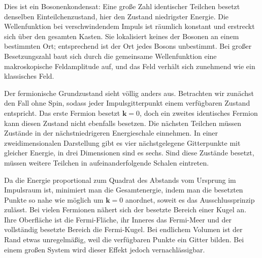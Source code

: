 Dies ist ein Bosonenkondensat: Eine große Zahl identischer Teilchen besetzt denselben Einteilchenzustand, hier den Zustand niedrigster Energie. Die Wellenfunktion bei verschwindendem Impuls ist räumlich konstant und erstreckt sich über den gesamten Kasten. Sie lokalisiert keines der Bosonen an einem bestimmten Ort; entsprechend ist der Ort jedes Bosons unbestimmt. Bei großer Besetzungszahl baut sich durch die gemeinsame Wellenfunktion eine makroskopische Feldamplitude auf, und das Feld verhält sich zunehmend wie ein klassisches Feld.

Der fermionische Grundzustand sieht völlig anders aus. Betrachten wir zunächst den Fall ohne Spin, sodass jeder Impulsgitterpunkt einem verfügbaren Zustand entspricht. Das erste Fermion besetzt \(\mathbf{k}=0\), doch ein zweites identisches Fermion kann diesen Zustand nicht ebenfalls besetzen. Die nächsten Teilchen müssen Zustände in der nächstniedrigeren Energieschale einnehmen. In einer zweidimensionalen Darstellung gibt es vier nächstgelegene Gitterpunkte mit gleicher Energie, in drei Dimensionen sind es sechs. Sind diese Zustände besetzt, müssen weitere Teilchen in aufeinanderfolgende Schalen eintreten.

Da die Energie proportional zum Quadrat des Abstands vom Ursprung im Impulsraum ist, minimiert man die Gesamtenergie, indem man die besetzten Punkte so nahe wie möglich um \(\mathbf{k}=0\) anordnet, soweit es das Ausschlussprinzip zulässt. Bei vielen Fermionen nähert sich der besetzte Bereich einer Kugel an. Ihre Oberfläche ist die Fermi-Fläche, ihr Inneres das Fermi-Meer und der vollständig besetzte Bereich die Fermi-Kugel. Bei endlichem Volumen ist der Rand etwas unregelmäßig, weil die verfügbaren Punkte ein Gitter bilden. Bei einem großen System wird dieser Effekt jedoch vernachlässigbar.

